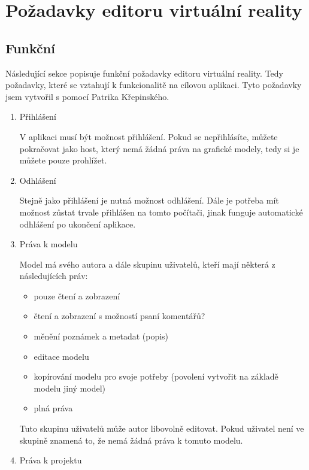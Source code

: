 \documentclass[thesis=B,czech]{FITthesis}[2012/06/26]
\begin{document}
    \section{Požadavky editoru virtuální reality}
        \subsection{Funkční} \label{sec:analFP}
            Následující sekce popisuje funkční požadavky editoru virtuální reality. Tedy požadavky, které se vztahují k funkcionalitě na cílovou aplikaci. Tyto požadavky jsem vytvořil s pomocí Patrika Křepinského.
            \begin{enumerate}
                \item Přihlášení
                
                V aplikaci musí být možnost přihlášení. Pokud se nepřihlásíte, můžete pokračovat jako host, který nemá žádná práva na grafické modely, tedy si je můžete pouze prohlížet.
                \item Odhlášení
                
                Stejně jako přihlášení je nutná možnost odhlášení. Dále je potřeba mít možnost zůstat trvale přihlášen na tomto počítači, jinak funguje automatické odhlášení po ukončení aplikace.
               \item Práva k modelu
               
                Model má svého autora a dále skupinu uživatelů, kteří mají některá z následujících práv:
                \begin{itemize}
                    \item pouze čtení a zobrazení
                    \item čtení a zobrazení s možností psaní komentářů?
                    \item měnění poznámek a metadat (popis)
                    \item editace modelu
                    \item kopírování modelu pro svoje potřeby (povolení vytvořit na základě modelu jiný model)
                    \item plná práva
                \end{itemize}
                Tuto skupinu uživatelů může autor libovolně editovat. Pokud uživatel není ve skupině znamená to, že nemá žádná práva k tomuto modelu.
               \item Práva k projektu
               

\end{enumerate}
\end{document}
